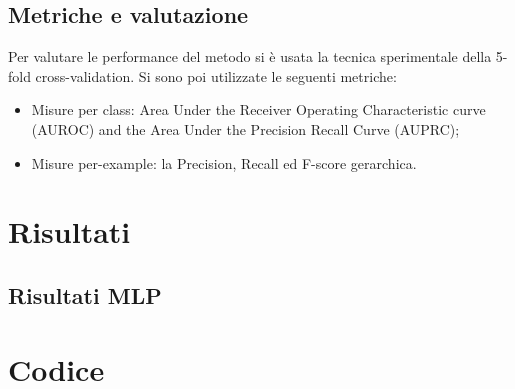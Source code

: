 \documentclass{article}
\begin{document}
\subsection{Metriche e valutazione}

Per valutare le performance del metodo si è usata la tecnica sperimentale della 5-fold
cross-validation.  Si sono poi utilizzate le seguenti metriche:

\begin{itemize}
\item Misure per  class:   Area  Under  the  Receiver  Operating  Characteristic
curve (AUROC) and the Area Under the Precision Recall Curve (AUPRC);
\item Misure per-example: la Precision, Recall ed F-score gerarchica.
\end{itemize}

\section{Risultati}
\subsection{Risultati MLP}

\section{Codice}
\end{document}
